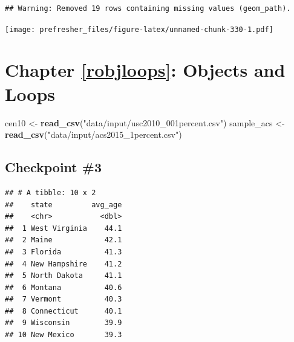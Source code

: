 \documentclass[]{book}
\newenvironment{Shaded}{\begin{snugshade}}{\end{snugshade}}
\newcommand{\KeywordTok}[1]{\textcolor[rgb]{0.13,0.29,0.53}{\textbf{#1}}}
\newcommand{\DataTypeTok}[1]{\textcolor[rgb]{0.13,0.29,0.53}{#1}}
\newcommand{\DecValTok}[1]{\textcolor[rgb]{0.00,0.00,0.81}{#1}}
\newcommand{\StringTok}[1]{\textcolor[rgb]{0.31,0.60,0.02}{#1}}
\newcommand{\OperatorTok}[1]{\textcolor[rgb]{0.81,0.36,0.00}{\textbf{#1}}}
\newcommand{\NormalTok}[1]{#1}
\theoremstyle{definition}
\theoremstyle{definition}
\theoremstyle{definition}
\theoremstyle{remark}
\begin{document}
\begin{verbatim}
## Warning: Removed 19 rows containing missing values (geom_path).
\end{verbatim}

\texttt{[image: prefresher\_files/figure-latex/unnamed-chunk-330-1.pdf]}

\section{Chapter \ref{robjloops}: Objects and
Loops}\label{chapter-refrobjloops-objects-and-loops}

\begin{Shaded}
\begin{Highlighting}[]
\NormalTok{cen10 <-}\StringTok{ }\KeywordTok{read_csv}\NormalTok{(}\StringTok{"data/input/usc2010_001percent.csv"}\NormalTok{)}
\NormalTok{sample_acs <-}\StringTok{ }\KeywordTok{read_csv}\NormalTok{(}\StringTok{"data/input/acs2015_1percent.csv"}\NormalTok{)}
\end{Highlighting}
\end{Shaded}

\subsection*{Checkpoint \#3}\label{checkpoint-3}

\begin{Shaded}
\end{Shaded}

\begin{verbatim}
## # A tibble: 10 x 2
##    state         avg_age
##    <chr>           <dbl>
##  1 West Virginia    44.1
##  2 Maine            42.1
##  3 Florida          41.3
##  4 New Hampshire    41.2
##  5 North Dakota     41.1
##  6 Montana          40.6
##  7 Vermont          40.3
##  8 Connecticut      40.1
##  9 Wisconsin        39.9
## 10 New Mexico       39.3
\end{verbatim}
\end{document}
